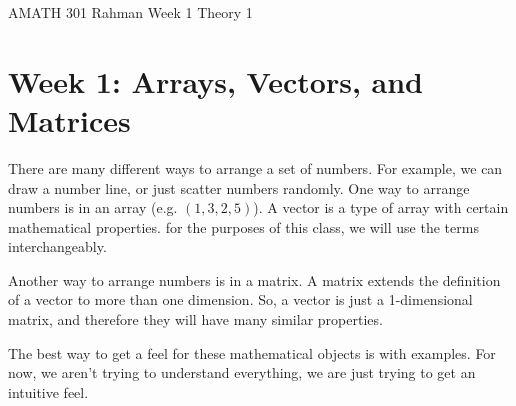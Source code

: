 \documentclass[reqno]{amsart}
\theoremstyle{definition}
\begin{document}
\begin{flushleft}
{\sc \Large AMATH 301 Rahman} \hfill Week 1 Theory 1
\bigskip
\end{flushleft}

\newcommand{\R}{\mathbb{R}}
\newcommand{\N}{\mathbb{N}}
\newcommand{\Z}{\mathbb{Z}}
\newcommand{\Q}{\mathbb{Q}}
\renewcommand{\CancelColor}{\color{red}}
\newcommand{\?}{\stackrel{?}{=}}
\renewcommand{\varphi}{\phi}
\newcommand{\card}{\text{Card}}
\newcommand{\bigzero}{\text{\Huge 0}}



\section*{Week 1:  Arrays, Vectors, and Matrices}

There are many different ways to arrange a set of numbers.  For example, we can draw a number line, or just scatter numbers randomly.  One way to arrange numbers is in an array (e.g. $(1, 3, 2, 5)$).  A vector is a type of array with certain mathematical properties.  for the purposes of this class, we will use the terms interchangeably.

Another way to arrange numbers is in a matrix.  A matrix extends the definition of a vector to more than one dimension.  So, a vector is just a 1-dimensional matrix, and therefore they will have many similar properties.

The best way to get a feel for these mathematical objects is with examples.  For now, we aren't trying to understand everything, we are just trying to get an intuitive feel.
\end{document}
